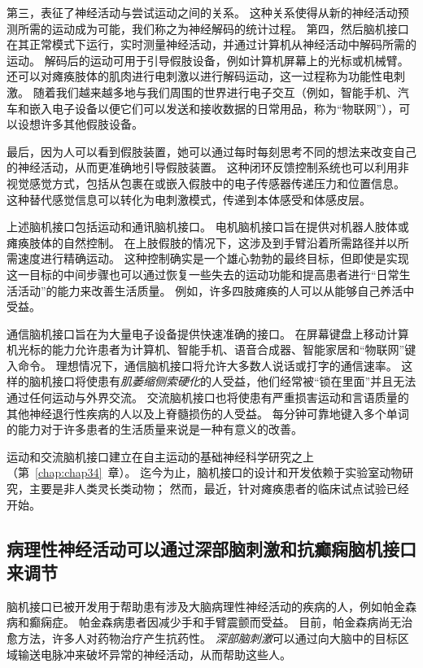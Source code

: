 第三，表征了神经活动与尝试运动之间的关系。
这种关系使得从新的神经活动预测所需的运动成为可能，我们称之为神经解码的统计过程。
第四，然后脑机接口在其正常模式下运行，实时测量神经活动，并通过计算机从神经活动中解码所需的运动。
解码后的运动可用于引导假肢设备，例如计算机屏幕上的光标或机械臂。
还可以对瘫痪肢体的肌肉进行电刺激以进行解码运动，这一过程称为功能性电刺激。
随着我们越来越多地与我们周围的世界进行电子交互（例如，智能手机、汽车和嵌入电子设备以便它们可以发送和接收数据的日常用品，称为“物联网”），可以设想许多其他假肢设备。


最后，因为人可以看到假肢装置，她可以通过每时每刻思考不同的想法来改变自己的神经活动，从而更准确地引导假肢装置。
这种闭环反馈控制系统也可以利用非视觉感觉方式，包括从包裹在或嵌入假肢中的电子传感器传递压力和位置信息。
这种替代感觉信息可以转化为电刺激模式，传递到本体感受和体感皮层。


上述脑机接口包括运动和通讯脑机接口。
电机脑机接口旨在提供对机器人肢体或瘫痪肢体的自然控制。
在上肢假肢的情况下，这涉及到手臂沿着所需路径并以所需速度进行精确运动。
这种控制确实是一个雄心勃勃的最终目标，但即使是实现这一目标的中间步骤也可以通过恢复一些失去的运动功能和提高患者进行“日常生活活动”的能力来改善生活质量。
例如，许多四肢瘫痪的人可以从能够自己养活中受益。


通信脑机接口旨在为大量电子设备提供快速准确的接口。 
在屏幕键盘上移动计算机光标的能力允许患者为计算机、智能手机、语音合成器、智能家居和“物联网”键入命令。 
理想情况下，通信脑机接口将允许大多数人说话或打字的通信速率。
这样的脑机接口将使患有\textit{肌萎缩侧索硬化}的人受益，他们经常被“锁在里面”并且无法通过任何运动与外界交流。
交流脑机接口也将使患有严重损害运动和言语质量的其他神经退行性疾病的人以及上脊髓损伤的人受益。
每分钟可靠地键入多个单词的能力对于许多患者的生活质量来说是一种有意义的改善。


运动和交流脑机接口建立在自主运动的基础神经科学研究之上（第~\ref{chap:chap34}~章）。 
迄今为止，脑机接口的设计和开发依赖于实验室动物研究，主要是非人类灵长类动物；
然而，最近，针对瘫痪患者的临床试点试验已经开始。



\subsection{病理性神经活动可以通过深部脑刺激和抗癫痫脑机接口来调节}

脑机接口已被开发用于帮助患有涉及大脑病理性神经活动的疾病的人，例如帕金森病和癫痫症。
帕金森病患者因减少手和手臂震颤而受益。 
目前，帕金森病尚无治愈方法，许多人对药物治疗产生抗药性。
\textit{深部脑刺激}可以通过向大脑中的目标区域输送电脉冲来破坏异常的神经活动，从而帮助这些人。


